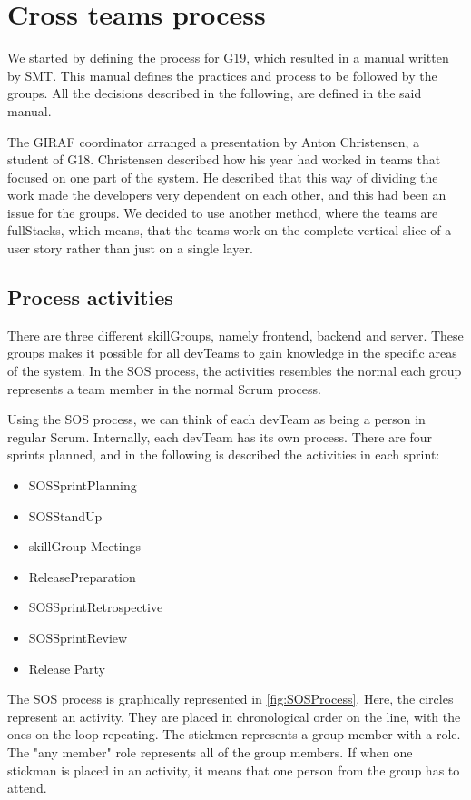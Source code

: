 \section{Cross teams process}
We started by defining the process for \gls{G19}, which resulted in a manual\cite{processManual} written by \gls{SMT}. This manual defines the practices and process to be followed by the groups. All the decisions described in the following, are defined in the said manual.

The GIRAF coordinator arranged a presentation by Anton Christensen, a student of \gls{G18}.
Christensen described how his year had worked in teams that focused on one part of the system. 
He described that this way of dividing the work made the developers very dependent on each other, and this had been an issue for the groups. 
We decided to use another method, where the teams are \Glspl{fullStack}, which means, that the teams work on the complete vertical slice of a user story rather than just on a single layer. 

\subsection{Process activities}
There are three different \glspl{skillGroup}, namely frontend, backend and server. These groups makes it possible for all \glspl{devTeam} to gain knowledge in the specific areas of the system.
In the \gls{SOS} process, the activities resembles the normal each group represents a team member in the normal Scrum process.

Using the \gls{SOS} process, we can think of each \gls{devTeam} as being a person in regular Scrum. Internally, each \gls{devTeam} has its own process. 
There are four sprints planned, and in the following is described the activities in each sprint:

\begin{itemize}
    \item \Gls{SOSSprintPlanning}
    \item \Gls{SOSStandUp}
    \item \Gls{skillGroup} Meetings
    \item \Gls{ReleasePreparation}
    \item \Gls{SOSSprintRetrospective}
    \item \Gls{SOSSprintReview}
    \item Release Party
\end{itemize}

The SOS process is graphically represented in \autoref{fig:SOSProcess}. Here, the circles represent an activity. They are placed in chronological order on the line, with the ones on the loop repeating. The stickmen represents a group member with a role. The "any member" role represents all of the group members. If when one stickman is placed in an activity, it means that one person from the group has to attend. 


